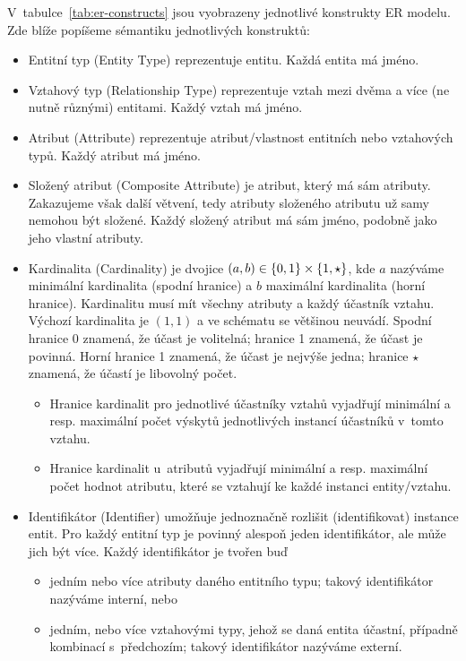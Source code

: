 V~tabulce~\ref{tab:er-constructs} jsou vyobrazeny jednotlivé konstrukty ER modelu.
Zde blíže popíšeme sémantiku jednotlivých konstruktů:
\begin{itemize}
  \item Entitní typ (Entity Type) reprezentuje entitu.
        Každá entita má jméno.
  \item Vztahový typ (Relationship Type) reprezentuje vztah mezi dvěma a více (ne nutně různými) entitami.
        Každý vztah má jméno.
  \item Atribut (Attribute) reprezentuje atribut/vlastnost entitních nebo vztahových typů.
        Každý atribut má jméno.
  \item Složený atribut (Composite Attribute) je atribut, který má sám atributy.
        Zakazujeme však další větvení, tedy atributy složeného atributu už samy nemohou být složené.
        Každý složený atribut má sám jméno, podobně jako jeho vlastní atributy.
  \item Kardinalita (Cardinality) je dvojice $(a, b) \in \left\{0, 1\right\}\times \left\{1, \star\right\}$, kde $a$ nazýváme minimální kardinalita (spodní hranice) a $b$ maximální kardinalita (horní hranice).
        Kardinalitu musí mít všechny atributy a každý účastník vztahu.
        Výchozí kardinalita je $(1, 1)$ a ve schématu se většinou neuvádí.
        Spodní hranice 0 znamená, že účast je volitelná; hranice 1 znamená, že účast je povinná.
        Horní hranice 1 znamená, že účast je nejvýše jedna; hranice $\star$ znamená, že účastí je libovolný počet.
        \begin{itemize}
          \item Hranice kardinalit pro jednotlivé účastníky vztahů vyjadřují minimální a resp. maximální počet výskytů jednotlivých instancí účastníků v~tomto vztahu.
          \item Hranice kardinalit u~atributů vyjadřují minimální a resp. maximální počet hodnot atributu, které se vztahují ke každé instanci entity/vztahu.
        \end{itemize}
  \item Identifikátor (Identifier) umožňuje jednoznačně rozlišit (identifikovat) instance entit.
        Pro každý entitní typ je povinný alespoň jeden identifikátor, ale může jich být více.
        Každý identifikátor je tvořen buď
        \begin{itemize}
          \item jedním nebo více atributy daného entitního typu; takový identifikátor nazýváme interní, nebo
          \item jedním, nebo více vztahovými typy, jehož se daná entita účastní, případně kombinací s~předchozím; takový identifikátor nazýváme externí.
        \end{itemize}
\end{itemize}

